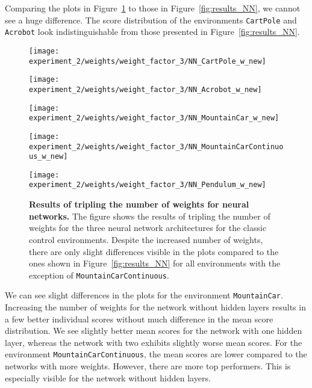 Comparing the plots in Figure~\ref{fig:results_NN_weights} to those in Figure~\ref{fig:results_NN}, we cannot see a huge difference. The score distribution of the environments \verb|CartPole| and \verb|Acrobot| look indistinguishable from those presented in Figure~\ref{fig:results_NN}.
\begin{figure}
  \centering
  \texttt{[image: experiment\_2/weights/weight\_factor\_3/NN\_CartPole\_w\_new]}

  \vspace{0.2cm}

  \texttt{[image: experiment\_2/weights/weight\_factor\_3/NN\_Acrobot\_w\_new]}

  \vspace{0.2cm}

  \texttt{[image: experiment\_2/weights/weight\_factor\_3/NN\_MountainCar\_w\_new]}

  \vspace{0.2cm}

  \texttt{[image: experiment\_2/weights/weight\_factor\_3/NN\_MountainCarContinuous\_w\_new]}

  \vspace{0.2cm}

  \texttt{[image: experiment\_2/weights/weight\_factor\_3/NN\_Pendulum\_w\_new]}
\caption[Results of tripling the number of weights for neural networks]{
  \textbf{Results of tripling the number of weights for neural networks.}
   The figure shows the results of tripling the number of weights for the three neural network architectures for the classic control environments. Despite the increased number of weights, there are only slight differences visible in the plots compared to the ones shown in Figure~\ref{fig:results_NN} for all environments with the exception of \texttt{MountainCarContinuous}.
}
\label{fig:results_NN_weights}
\end{figure}
We can see slight differences in the plots for the environment \verb|MountainCar|. Increasing the number of weights for the network without hidden layers results in a few better individual scores without much difference in the mean score distribution. We see slightly better mean scores for the network with one hidden layer, whereas the network with two exhibits slightly worse mean scores. For the environment \verb|MountainCarContinuous|, the mean scores are lower compared to the networks with more weights. However, there are more top performers.  This is especially visible for the network without hidden layers.

